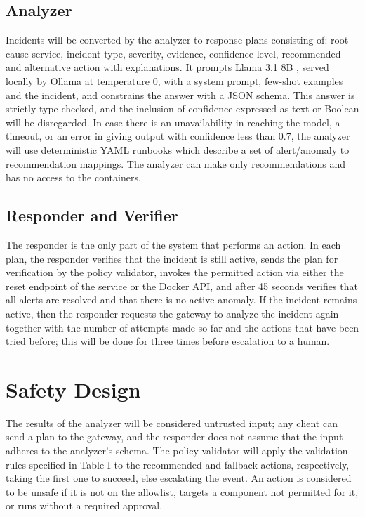 \documentclass[conference,a4paper]{IEEEtran}
\begin{document}
\subsection{Analyzer}

Incidents will be converted by the analyzer to response plans consisting of: root cause service, incident type, severity, evidence, confidence level, recommended and alternative action with explanations. It prompts Llama 3.1 8B \cite{b14}, served locally by Ollama at temperature 0, with a system prompt, few-shot examples and the incident, and constrains the answer with a JSON schema. This answer is strictly type-checked, and the inclusion of confidence expressed as text or Boolean will be disregarded. In case there is an unavailability in reaching the model, a timeout, or an error in giving output with confidence less than 0.7, the analyzer will use deterministic YAML runbooks which describe a set of alert/anomaly to recommendation mappings. The analyzer can make only recommendations and has no access to the containers.

\subsection{Responder and Verifier}

The responder is the only part of the system that performs an action. In each plan, the responder verifies that the incident is still active, sends the plan for verification by the policy validator, invokes the permitted action via either the reset endpoint of the service or the Docker API, and after 45 seconds verifies that all alerts are resolved and that there is no active anomaly. If the incident remains active, then the responder requests the gateway to analyze the incident again together with the number of attempts made so far and the actions that have been tried before; this will be done for three times before escalation to a human.

\section{Safety Design}

The results of the analyzer will be considered untrusted input; any client can send a plan to the gateway, and the responder does not assume that the input adheres to the analyzer's schema. The policy validator will apply the validation rules specified in Table I to the recommended and fallback actions, respectively, taking the first one to succeed, else escalating the event. An action is considered to be unsafe if it is not on the allowlist, targets a component not permitted for it, or runs without a required approval.
\end{document}
